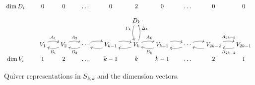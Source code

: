 \documentclass[11pt,reqno]{amsart}
\numberwithin{equation}{section}
\theoremstyle{definition}
\begin{document}
\begin{figure}[ht!]
\caption{Quiver representations in $S_{k,k}$ and the dimension vectors.}
 \label{figure:Skk}
\[ 
\xymatrix@C=18pt@R=9pt{
\dim D_i& 0&0&\ldots&0&2&0&\ldots&0&0
\\
&
& &  &   &
\ar@/_/[dd]_<(0.2){\Gamma_k}
D_k
& &  &  &
\\ & & & & & & &  && 
\\ 
&%
{V_1}  
	\ar@/^/[r]^{A_1} 
	& 
	\ar@/^/[l]^{B_1}
{V_2}
	\ar@/^/[r]^{A_2}
	&
	\ar@/^/[l]^{B_2}
	\cdots
	\ar@/^/[r]%
	&   
	\ar@/^/[l]%
{V_{k-1}} 
	\ar@/^/[r]%
	& 
	\ar@/^/[l]%
{V_k}  
	\ar@/_/[uu]_>(0.8){\Delta_k} 
	\ar@/^/[r]^{A_{k}}
	&   
	\ar@/^/[l]^{B_k}
{V_{k+1}}  
	\ar@/^/[r]%
	& 
	\ar@/^/[l]%
	\cdots
	\ar@/^/[r]%
	&
	\ar@/^/[l]%
{V_{2k-2}}  
	\ar@/^/[r]^{A_{2k-2}}
	& 
{V_{2k-1}} 
\ar@/^/[l]^{B_{2k-2}}  
\\
\dim V_i & 1&2&\ldots&k-1&k&k-1&\ldots&2&1
}
\] 
\end{figure}
\end{document}
